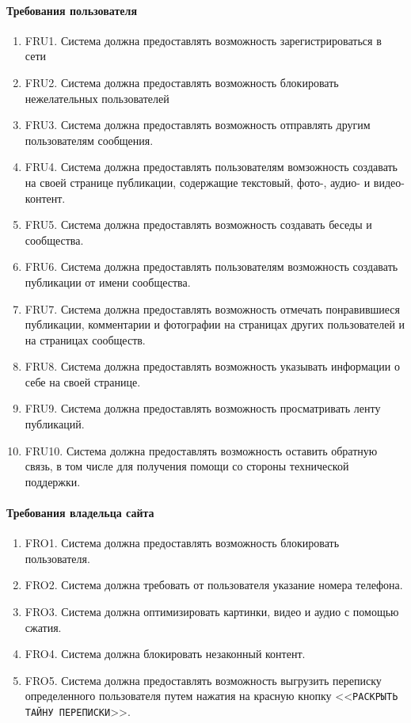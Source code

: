 \paragraph{Требования пользователя}
\begin{enumerate}
  \item FRU1. Система должна предоставлять возможность зарегистрироваться в сети
  \item FRU2. Система должна предоставлять возможность блокировать нежелательных пользователей
  \item FRU3. Система должна предоставлять возможность отправлять другим пользователям сообщения.
  \item FRU4. Система должна предоставлять пользователям вомзожность создавать на своей странице публикации, содержащие текстовый, фото-, аудио- и видео-контент.
  \item FRU5. Система должна предоставлять возможность создавать беседы и сообщества.
  \item FRU6. Система должна предоставлять пользователям возможность создавать публикации от имени сообщества.
  \item FRU7. Система должна предоставлять возможность отмечать понравившиеся публикации, комментарии и фотографии на страницах других пользователей и на страницах сообществ.
  \item FRU8. Система должна предоставлять возможность указывать информации о себе на своей странице.
  \item FRU9. Система должна предоставлять возможность просматривать ленту публикаций.
  \item FRU10. Система должна предоставлять возможность оставить обратную связь, в том числе для получения помощи со стороны технической поддержки.
\end{enumerate}

\paragraph{Требования владельца сайта}
\begin{enumerate}
\item FRO1. Система должна предоставлять возможность блокировать пользователя.
\item FRO2. Система должна требовать от пользователя указание номера телефона.
\item FRO3. Система должна оптимизировать картинки, видео и аудио с помощью сжатия.
\item FRO4. Система должна блокировать незаконный контент.
\item FRO5. Система должна предоставлять возможность выгрузить переписку определенного пользователя
  путем нажатия на красную кнопку <<\texttt{РАСКРЫТЬ ТАЙНУ ПЕРЕПИСКИ}>>.
\end{enumerate}


